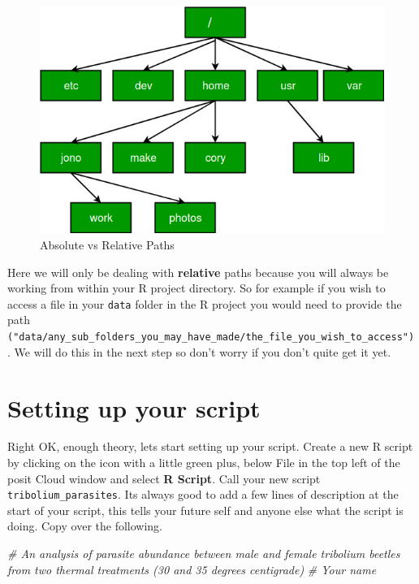 \documentclass[
]{book}
\newenvironment{Shaded}{\begin{snugshade}}{\end{snugshade}}
\newcommand{\CommentTok}[1]{\textcolor[rgb]{0.56,0.35,0.01}{\textit{#1}}}
\begin{document}
\begin{figure}
\includegraphics[width=0.9\linewidth]{figures/absolutePathNames} \caption{Absolute vs Relative Paths}\label{fig:unnamed-chunk-27}
\end{figure}

Here we will only be dealing with \textbf{relative} paths because you will always be working from within your R project directory. So for example if you wish to access a file in your \texttt{data} folder in the R project you would need to provide the path \texttt{("data/any\_sub\_folders\_you\_may\_have\_made/the\_file\_you\_wish\_to\_access")}. We will do this in the next step so don't worry if you don't quite get it yet.

\hypertarget{script}{%
\section{Setting up your script}\label{script}}

Right OK, enough theory, lets start setting up your script. Create a new R script by clicking on the icon with a little green plus, below File in the top left of the posit Cloud window and select \textbf{R Script}. Call your new script \texttt{tribolium\_parasites}. Its always good to add a few lines of description at the start of your script, this tells your future self and anyone else what the script is doing. Copy over the following.

\begin{Shaded}
\begin{Highlighting}[]
\CommentTok{\# An analysis of parasite abundance between male and female tribolium beetles from two thermal treatments (30 and 35 degrees centigrade)}
\CommentTok{\# Your name}
\end{Highlighting}
\end{Shaded}
\end{document}
